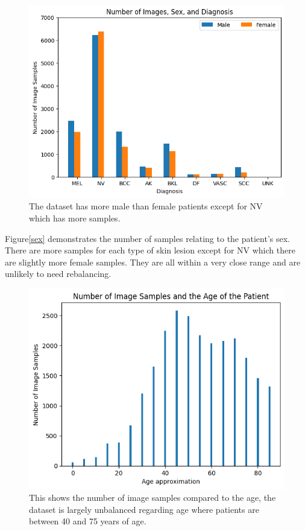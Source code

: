 \begin{figure}
	\centering
	\includegraphics[scale=0.75]{images/ISIC/number-sex-diagnosis.png}
	\caption{The dataset has more male than female patients except for NV which has more samples.}
\end{figure} \label{sex}

Figure\ref{sex} demonstrates the number of samples relating to the patient's sex. There are more samples for each type of skin lesion except for NV which there are slightly more female samples. They are all within a very close range and are unlikely to need rebalancing.

\begin{figure}
	\centering
	\includegraphics[scale=0.75]{images/ISIC/age-number.png}
	\caption{This shows the number of image samples compared to the age, the dataset is largely unbalanced regarding age where patients are between 40 and 75 years of age.}
\end{figure} \label{age-number}

